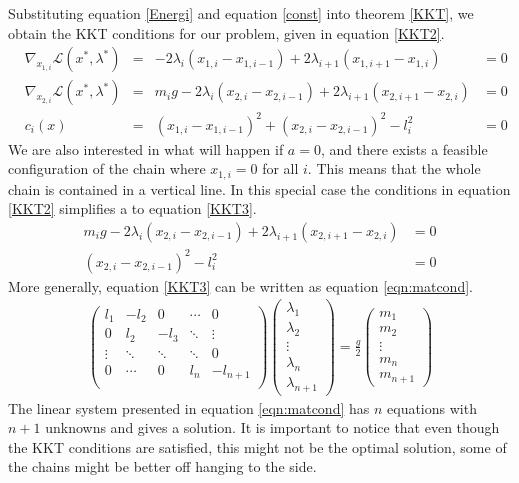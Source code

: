 Substituting equation \eqref{Energi} and equation \eqref{const} into theorem \ref{KKT}, we obtain the KKT conditions for our problem, given in equation \eqref{KKT2}.
\begin{equation}\begin{aligned} \label{KKT2}
&\nabla_{x_{1,i}}\mathcal{L}(x^*,\lambda^*)&=& -2 \lambda_i (x_{1,i}-x_{1,i-1}) +2 \lambda_{i+1}(x_{1,i+1}-x_{1,i})&=0 \\
&\nabla_{x_{2,i}}\mathcal{L}(x^*,\lambda^*)&=& m_i g - 2 \lambda_i (x_{2,i}-x_{2,i-1}) +2 \lambda_{i+1}(x_{2,i+1}-x_{2,i})&=0 \\
&c_i(x) &=& (x_{1,i}-x_{1,i-1})^2 + (x_{2,i}-x_{2,i-1})^2-l^2_i&=0
\end{aligned}\end{equation}
We are also interested in what will happen if $a=0$, and there exists a feasible configuration of the chain where $x_{1,i} =0$ for all $i$. This means that the whole chain is contained in a vertical line. In this special case the conditions in equation \eqref{KKT2} simplifies a to equation \eqref{KKT3}.
\begin{equation}\begin{aligned}  \label{KKT3}
 m_i g - 2 \lambda_i (x_{2,i}-x_{2,i-1}) +2 \lambda_{i+1}(x_{2,i+1}-x_{2,i})&=0 \\
 (x_{2,i}-x_{2,i-1})^2-l^2_i&=0
\end{aligned}\end{equation}
More generally, equation \eqref{KKT3} can be written as equation \eqref{eqn:matcond}.
\begin{equation}\begin{aligned}\label{eqn:matcond}
\begin{pmatrix}
l_1 & -l_2 & 0& \cdots & 0 \\
0 & l_2 & -l_3 & \ddots & \vdots \\
\vdots & \ddots & \ddots & \ddots & 0 \\
0 & \cdots & 0 & l_n & -l_{n+1} \\
\end{pmatrix}
 \begin{pmatrix}
\lambda_1		\\
\lambda_2 	\\
\vdots 	\\ 
\lambda_n 		\\ 
\lambda_{n+1} 
\end{pmatrix}
= \frac{g}{2}
 \begin{pmatrix}
m_1		\\
m_2 		\\
\vdots 	\\ 
m_n 		\\ 
m_{n+1} 
\end{pmatrix}
\end{aligned}\end{equation}
The linear system presented in equation \eqref{eqn:matcond} has $n$ equations with $n+1$ unknowns and gives a solution. It is important to notice that even though the KKT conditions are satisfied, this might not be the optimal solution, some of the chains might be better off hanging to the side.

